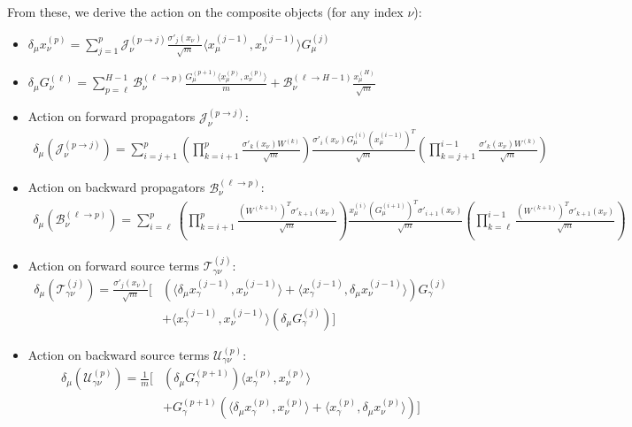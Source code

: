 \documentclass[11pt,a4paper]{article}
\theoremstyle{definition}
\begin{document}
From these, we derive the action on the composite objects (for any index $\nu$):
\begin{itemize}
    \item $\delta_\mu x^{(p)}_\nu = \sum_{j=1}^{p} \mathcal{J}^{(p \to j)}_{\nu} \frac{\sigma'_{j}(x_\nu)}{\sqrt{m}} \langle x^{(j-1)}_\mu, x^{(j-1)}_\nu \rangle G^{(j)}_\mu$
    \item $\delta_\mu G^{(\ell)}_\nu = \sum_{p=\ell}^{H-1} \mathcal{B}^{(\ell \to p)}_{\nu} \frac{G^{(p+1)}_\mu \langle x^{(p)}_\mu, x^{(p)}_\nu \rangle}{m} + \mathcal{B}^{(\ell \to H-1)}_{\nu} \frac{x^{(H)}_\mu}{\sqrt{m}}$
    \item Action on forward propagators $\mathcal{J}^{(p \to j)}_{\nu}$:
    \begin{align}
        \delta_\mu(\mathcal{J}^{(p \to j)}_{\nu}) = \sum_{i=j+1}^{p} \left( \prod_{k=i+1}^{p} \frac{\sigma'_{k}(x_\nu) W^{(k)}}{\sqrt{m}} \right) \frac{\sigma'_{i}(x_\nu) G^{(i)}_\mu (x^{(i-1)}_\mu)^T}{\sqrt{m}} \left( \prod_{k=j+1}^{i-1} \frac{\sigma'_{k}(x_\nu) W^{(k)}}{\sqrt{m}} \right)
    \end{align}
    \item Action on backward propagators $\mathcal{B}^{(\ell \to p)}_{\nu}$:
    \begin{align}
        \delta_\mu(\mathcal{B}^{(\ell \to p)}_{\nu}) = \sum_{i=\ell}^{p} \left( \prod_{k=i+1}^{p} \frac{(W^{(k+1)})^T \sigma'_{k+1}(x_\nu)}{\sqrt{m}} \right) \frac{x^{(i)}_\mu (G^{(i+1)}_\mu)^T \sigma'_{i+1}(x_\nu)}{\sqrt{m}} \left( \prod_{k=\ell}^{i-1} \frac{(W^{(k+1)})^T \sigma'_{k+1}(x_\nu)}{\sqrt{m}} \right)
    \end{align}
    \item Action on forward source terms $\mathcal{T}^{(j)}_{\gamma\nu}$:
    \begin{align}
        \delta_\mu(\mathcal{T}^{(j)}_{\gamma\nu}) = \frac{\sigma'_{j}(x_\nu)}{\sqrt{m}} \Biggl[ & \left( \langle \delta_\mu x^{(j-1)}_\gamma, x^{(j-1)}_\nu \rangle + \langle x^{(j-1)}_\gamma, \delta_\mu x^{(j-1)}_\nu \rangle \right) G^{(j)}_\gamma \nonumber \\
        & + \langle x^{(j-1)}_\gamma, x^{(j-1)}_\nu \rangle (\delta_\mu G^{(j)}_\gamma) \Biggr]
    \end{align}
    \item Action on backward source terms $\mathcal{U}^{(p)}_{\gamma\nu}$:
    \begin{align}
        \delta_\mu(\mathcal{U}^{(p)}_{\gamma\nu}) = \frac{1}{m} \Biggl[ & (\delta_\mu G^{(p+1)}_\gamma) \langle x^{(p)}_\gamma, x^{(p)}_\nu \rangle \nonumber \\
        & + G^{(p+1)}_\gamma \left( \langle \delta_\mu x^{(p)}_\gamma, x^{(p)}_\nu \rangle + \langle x^{(p)}_\gamma, \delta_\mu x^{(p)}_\nu \rangle \right) \Biggr]
    \end{align}
\end{itemize}
\end{document}

